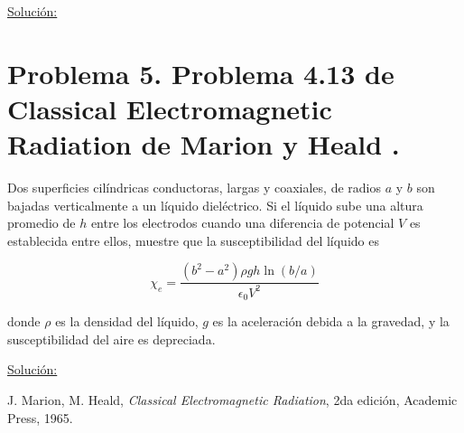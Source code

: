 \documentclass[a4paper,11pt]{article}
\numberwithin{equation}{section}
\begin{document}
\vspace{.3cm}

\underline{Solución:} \vspace{.3cm}

\newpage

\section{Problema 5. Problema 4.13 de Classical Electromagnetic Radiation
de Marion y Heald \cite{marion2}.}

Dos superficies cilíndricas conductoras, largas y coaxiales, de radios $a$ y $b$ 
son bajadas verticalmente a un líquido dieléctrico. Si el líquido sube una altura 
promedio de $h$ entre los electrodos cuando una diferencia de potencial $V$ es 
establecida entre ellos, muestre que la susceptibilidad del líquido es 

$$
\chi_e = \frac{(b^2 - a^2)\rho g h \ln{(b/a)}}{\epsilon_0 V^2}
$$

donde $\rho$ es la densidad del líquido, $g$ es la aceleración debida a la gravedad, 
y la susceptibilidad del aire es depreciada.

\vspace{.3cm}

\underline{Solución:} \vspace{.3cm}

\newpage

\begin{thebibliography}{10}
J. Marion, M. Heald, \emph{Classical Electromagnetic Radiation}, 2da edición, Academic 
Press, 1965.
\end{thebibliography}
\end{document}
